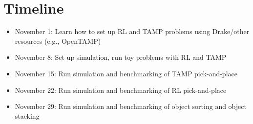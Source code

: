 \documentclass[12pt, letterpaper]{article}
\begin{document}
\section*{Timeline}
\begin{itemize}
  \item November 1: Learn how to set up RL and TAMP problems using Drake/other resources (e.g., OpenTAMP)
  \item November 8: Set up simulation, run toy problems with RL and TAMP
  \item November 15: Run simulation and benchmarking of TAMP pick-and-place
  \item November 22: Run simulation and benchmarking of RL pick-and-place
  \item November 29: Run simulation and benchmarking of object sorting and object stacking
\end{itemize}
\end{document}
